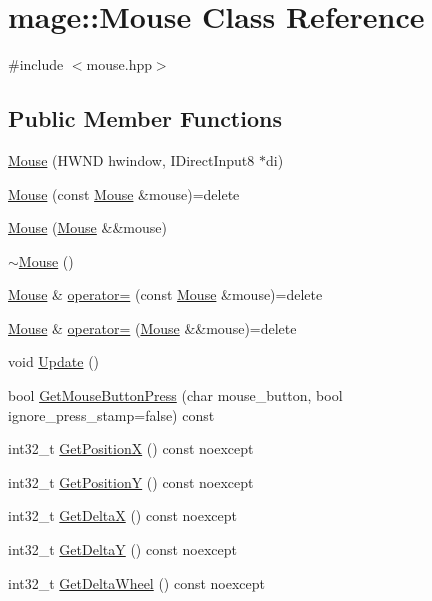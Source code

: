 \hypertarget{classmage_1_1_mouse}{}\section{mage\+:\+:Mouse Class Reference}
\label{classmage_1_1_mouse}


{\ttfamily \#include $<$mouse.\+hpp$>$}

\subsection*{Public Member Functions}
\begin{DoxyCompactItemize}
\item 
\hyperlink{classmage_1_1_mouse_ad02365977dab44603400ac6f24e0df97}{Mouse} (H\+W\+ND hwindow, I\+Direct\+Input8 $\ast$di)
\item 
\hyperlink{classmage_1_1_mouse_af11aa23e6cfbefb4cd3d90b17c63db7c}{Mouse} (const \hyperlink{classmage_1_1_mouse}{Mouse} \&mouse)=delete
\item 
\hyperlink{classmage_1_1_mouse_ad91b06f0a0df67eefc972997169d12c2}{Mouse} (\hyperlink{classmage_1_1_mouse}{Mouse} \&\&mouse)
\item 
\hyperlink{classmage_1_1_mouse_a855f1075ae774c8417d3da7a1e02d580}{$\sim$\+Mouse} ()
\item 
\hyperlink{classmage_1_1_mouse}{Mouse} \& \hyperlink{classmage_1_1_mouse_a585119f1b0db3fbc7436c86676518c8c}{operator=} (const \hyperlink{classmage_1_1_mouse}{Mouse} \&mouse)=delete
\item 
\hyperlink{classmage_1_1_mouse}{Mouse} \& \hyperlink{classmage_1_1_mouse_a42d80f535a12356762a506438036dd71}{operator=} (\hyperlink{classmage_1_1_mouse}{Mouse} \&\&mouse)=delete
\item 
void \hyperlink{classmage_1_1_mouse_a0cddae3f871dd69c1ba6928dc6b1f985}{Update} ()
\item 
bool \hyperlink{classmage_1_1_mouse_a9c8d4493c86685b259819b5995a17c7a}{Get\+Mouse\+Button\+Press} (char mouse\+\_\+button, bool ignore\+\_\+press\+\_\+stamp=false) const
\item 
int32\+\_\+t \hyperlink{classmage_1_1_mouse_ae3a79e5bd89cc0643859d67949d36d8a}{Get\+PositionX} () const noexcept
\item 
int32\+\_\+t \hyperlink{classmage_1_1_mouse_a1b0929c31a0422e4bfa79ec84ed4a735}{Get\+PositionY} () const noexcept
\item 
int32\+\_\+t \hyperlink{classmage_1_1_mouse_a9adb29bd36a28d6caf26017954a5cf7f}{Get\+DeltaX} () const noexcept
\item 
int32\+\_\+t \hyperlink{classmage_1_1_mouse_a0bf9de248294cacb4635e9eff5b2dc50}{Get\+DeltaY} () const noexcept
\item 
int32\+\_\+t \hyperlink{classmage_1_1_mouse_ab94f18e3197e37b7837de715085c846d}{Get\+Delta\+Wheel} () const noexcept
\end{DoxyCompactItemize}
